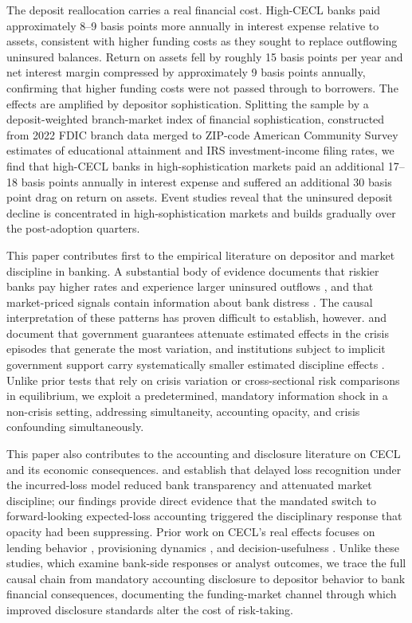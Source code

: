 The deposit reallocation carries a real financial cost.  High-CECL banks paid
approximately 8--9 basis points more annually in interest expense relative to
assets, consistent with higher funding costs as they sought to replace outflowing
uninsured balances.  Return on assets fell by roughly 15 basis points per year
and net interest margin compressed by approximately 9 basis points annually,
confirming that higher funding costs were not passed through to borrowers.  The
effects are amplified by depositor sophistication.  Splitting the sample by a
deposit-weighted branch-market index of financial sophistication, constructed
from 2022 FDIC branch data merged to ZIP-code American Community Survey estimates
of educational attainment and IRS investment-income filing rates, we find that
high-CECL banks in high-sophistication markets paid an additional 17--18 basis
points annually in interest expense and suffered an additional 30 basis point
drag on return on assets.  Event studies reveal that the uninsured deposit
decline is concentrated in high-sophistication markets and builds gradually over
the post-adoption quarters.

This paper contributes first to the empirical literature on depositor and market
discipline in banking.  A substantial body of evidence documents that riskier
banks pay higher rates and experience larger uninsured outflows
\citep{park1995market, martinez2001depositors, maechler2006dynamic,
egan2017deposit}, and that market-priced signals contain information about bank
distress \citep{flannery1996evidence, nier2006market}.  The causal
interpretation of these patterns has proven difficult to establish, however.
\citet{bennett2015market} and \citet{berger2015depositors} document that
government guarantees attenuate estimated effects in the crisis episodes that
generate the most variation, and institutions subject to implicit government
support carry systematically smaller estimated discipline effects
\citep{jacewitz2018deposit}.  Unlike prior tests that rely on crisis variation
or cross-sectional risk comparisons in equilibrium, we exploit a predetermined,
mandatory information shock in a non-crisis setting, addressing simultaneity,
accounting opacity, and crisis confounding simultaneously.

This paper also contributes to the accounting and disclosure literature on CECL
and its economic consequences.  \citet{bushman2012accounting} and
\citet{bushman2015delayed} establish that delayed loss recognition under the
incurred-loss model reduced bank transparency and attenuated market discipline;
our findings provide direct evidence that the mandated switch to forward-looking
expected-loss accounting triggered the disciplinary response that opacity had
been suppressing.  Prior work on CECL's real effects focuses on lending behavior
\citep{granja2025current}, provisioning dynamics \citep{kim2026current}, and
decision-usefulness \citep{gee2022decision}.  Unlike these studies, which examine
bank-side responses or analyst outcomes, we trace the full causal chain from
mandatory accounting disclosure to depositor behavior to bank financial
consequences, documenting the funding-market channel through which improved
disclosure standards alter the cost of risk-taking.

